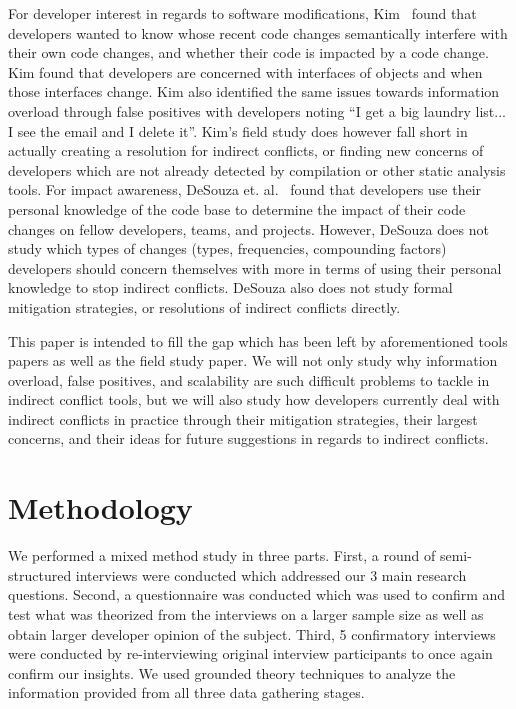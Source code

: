 \documentclass[conference]{IEEEtran}
\begin{document}
For developer interest in regards to software modifications, Kim~\cite{Kim:2011:ESA} found that developers wanted to know whose
recent code changes semantically interfere with their own code changes, and whether their code is impacted by a code change.
Kim found that developers are concerned with interfaces of objects and when those interfaces change. Kim also identified the same 
issues towards information overload through false positives with developers noting ``I get a big laundry list... I see the email and I delete it''.
Kim's field study does however fall short in actually creating a resolution for indirect conflicts, or finding new concerns of
developers which are not already detected by compilation or other static analysis tools. 
For impact awareness, DeSouza et. al.~\cite{deSouza:2008:ESS} found that developers use their personal knowledge of the
code base to determine the impact of their code changes on fellow developers, teams, and projects. However, DeSouza does not
study which types of changes (types, frequencies, compounding factors) developers should concern themselves with more in terms of using their personal knowledge
to stop indirect conflicts. DeSouza also does not study formal mitigation strategies, or resolutions of indirect conflicts directly.


This paper is intended to fill the gap which has been left by aforementioned tools papers as well as the field study paper.
We will not only study why information overload, false positives, and scalability are such difficult problems to tackle
in indirect conflict tools, but we will also study how developers currently deal with indirect conflicts in practice through
their mitigation strategies, their largest concerns, and their ideas for future suggestions in regards to indirect conflicts.

\section{Methodology}
\label{sec:meth}

We performed a mixed method study in three parts. First, a round of semi-structured interviews were conducted which
addressed our 3 main research questions. Second, a questionnaire was conducted
which was used to confirm and test what was theorized from the interviews on a larger sample size as well as obtain
larger developer opinion of the subject. Third, 5 confirmatory interviews were conducted by re-interviewing original
interview participants to once again confirm our insights.
We used grounded theory techniques to analyze the information provided from all three data gathering stages.
\end{document}
